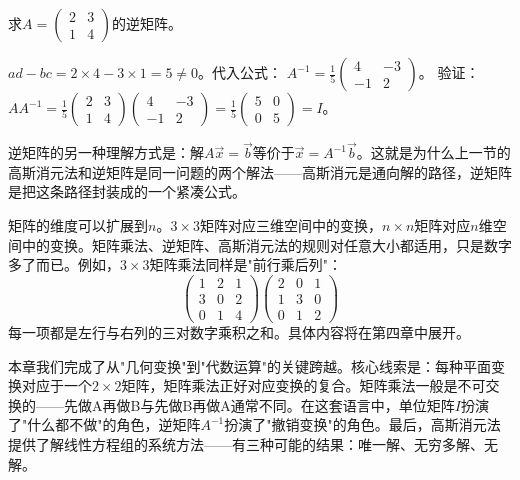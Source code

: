 \begin{example}
求$A=\begin{pmatrix}2&3\\1&4\end{pmatrix}$的逆矩阵。
\end{example}
\begin{solution}
$ad-bc=2\times4-3\times1=5\neq0$。代入公式：
$A^{-1}=\frac15\begin{pmatrix}4&-3\\-1&2\end{pmatrix}$。
验证：$AA^{-1}=\frac15\begin{pmatrix}2&3\\1&4\end{pmatrix}\begin{pmatrix}4&-3\\-1&2\end{pmatrix}
=\frac15\begin{pmatrix}5&0\\0&5\end{pmatrix}=I$。
\end{solution}

逆矩阵的另一种理解方式是：解$A\vec x = \vec b$等价于$\vec x = A^{-1}\vec b$。这就是为什么上一节的高斯消元法和逆矩阵是同一问题的两个解法——高斯消元是通向解的路径，逆矩阵是把这条路径封装成的一个紧凑公式。


矩阵的维度可以扩展到$n$。$3\times3$矩阵对应三维空间中的变换，$n\times n$矩阵对应$n$维空间中的变换。矩阵乘法、逆矩阵、高斯消元法的规则对任意大小都适用，只是数字多了而已。例如，$3\times3$矩阵乘法同样是"前行乘后列"：
\[
\begin{pmatrix}1&2&1\\3&0&2\\0&1&4\end{pmatrix}
\begin{pmatrix}2&0&1\\1&3&0\\0&1&2\end{pmatrix}
\]
每一项都是左行与右列的三对数字乘积之和。具体内容将在第四章中展开。


本章我们完成了从"几何变换"到"代数运算"的关键跨越。核心线索是：每种平面变换对应于一个$2\times2$矩阵，矩阵乘法正好对应变换的复合。矩阵乘法一般是不可交换的——先做A再做B与先做B再做A通常不同。在这套语言中，单位矩阵$I$扮演了"什么都不做"的角色，逆矩阵$A^{-1}$扮演了"撤销变换"的角色。最后，高斯消元法提供了解线性方程组的系统方法——有三种可能的结果：唯一解、无穷多解、无解。

